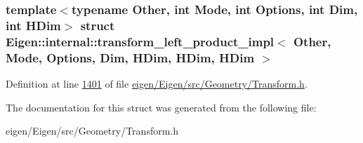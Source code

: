 \subsubsection*{template$<$typename Other, int Mode, int Options, int Dim, int H\+Dim$>$\newline
struct Eigen\+::internal\+::transform\+\_\+left\+\_\+product\+\_\+impl$<$ Other, Mode, Options, Dim, H\+Dim, H\+Dim, H\+Dim $>$}



Definition at line \hyperlink{eigen_2_eigen_2src_2_geometry_2_transform_8h_source_l01401}{1401} of file \hyperlink{eigen_2_eigen_2src_2_geometry_2_transform_8h_source}{eigen/\+Eigen/src/\+Geometry/\+Transform.\+h}.



The documentation for this struct was generated from the following file\+:\begin{DoxyCompactItemize}
\item 
eigen/\+Eigen/src/\+Geometry/\+Transform.\+h\end{DoxyCompactItemize}
